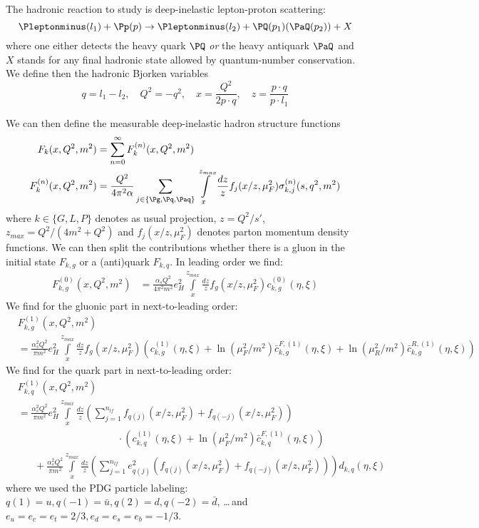The hadronic reaction to study is deep-inelastic lepton-proton scattering:
\begin{equation}
\Pleptonminus(l_1) + \Pp(p) \rightarrow \Pleptonminus(l_2) + \PQ(p_1)(\PaQ(p_2)) + X
\end{equation}
where one either detects the heavy quark $\PQ$ \textit{or} the heavy antiquark $\PaQ$ and $X$ stands for any final hadronic state allowed by quantum-number conservation. We define then the hadronic Bjorken variables
\begin{equation}
q=l_1-l_2, \quad Q^2=-q^2, \quad x=\frac{Q^2}{2p\cdot q}, \quad z = \frac{p\cdot q}{p\cdot l_1}
\end{equation}

We can then define the measurable deep-inelastic hadron structure functions
\begin{align}
F_k(x,Q^2,m^2) &= \sum_{n=0}^\infty F_{k}^{(n)}(x,Q^2,m^2)\\
F_{k}^{(n)}(x,Q^2,m^2) &= \frac{Q^2}{4\pi^2\alpha} \sum_{j\in\{\Pg,\Pq,\Paq\}}\int\limits_x^{z_{max}} \frac{dz}{z} f_j(x/z,\mu_F^2) \sigma^{(n)}_{k,j}(s,q^2,m^2)
\end{align}
where $k\in\{G,L,P\}$ denotes as usual projection, $z=Q^2/s'$, $z_{max} = Q^2/(4m^2+Q^2)$ and $f_j(x/z,\mu_F^2)$ denotes parton momentum density functions\cite{Martin:2009iq,PhysRevLett.113.012001}.
We can then split the contributions whether there is a gluon in the initial state $F_{k,g}$ or a (anti)quark $F_{k,q}$. In leading order we find:
\begin{align}
F_{k,g}^{(0)}(x,Q^2,m^2) &= \frac{\alpha_sQ^2}{4\pi^2m^2}e_H^2\int\limits_x^{z_{max}}\frac{dz}{z} f_g(x/z,\mu_F^2) c^{(0)}_{k,g}(\eta,\xi)
\end{align}
We find for the gluonic part in next-to-leading order:
\begin{align}
&F_{k,g}^{(1)}(x,Q^2,m^2) \nonumber\\
 &= \frac{\alpha_s^2Q^2}{\pi m^2}e_H^2\int\limits_x^{z_{max}}\frac{dz}{z} f_g(x/z,\mu_F^2) \left(c_{k,g}^{(1)}(\eta,\xi) + \ln(\mu_F^2/m^2)\bar c_{k,g}^{F,(1)}(\eta,\xi) + \ln(\mu_R^2/m^2)\bar c_{k,g}^{R,(1)}(\eta,\xi)\right)
\end{align}
We find for the quark part in next-to-leading order:
\begin{align}
&F_{k,q}^{(1)}(x,Q^2,m^2) \nonumber\\
 &= \frac{\alpha_s^2Q^2}{\pi m^2}e_H^2\int\limits_x^{z_{max}}\frac{dz}{z} \left(\sum_{j=1}^{n_{lf}}f_{q(j)}(x/z,\mu_F^2)+f_{q(-j)}(x/z,\mu_F^2)\right) \nonumber\\
 &\hspace{120pt} \cdot\left(c_{k,q}^{(1)}(\eta,\xi) + \ln(\mu_F^2/m^2)\bar c_{k,q}^{F,(1)}(\eta,\xi)\right) \nonumber\\
 &\hspace{20pt} + \frac{\alpha_s^2Q^2}{\pi m^2}\int\limits_x^{z_{max}}\frac{dz}{z} \left(\sum_{j=1}^{n_{lf}}e_{q(j)}^2\left(f_{q(j)}(x/z,\mu_F^2)+f_{q(-j)}(x/z,\mu_F^2)\right)\right) d_{k,q}(\eta,\xi)
\end{align}
where we used the PDG particle labeling\cite{Hagiwara:2002fs}: $q(1)=u,q(-1)=\bar u,q(2)=d,q(-2)=\bar d$, \ldots\,and $e_u = e_c = e_t = 2/3, e_d=e_s=e_b=-1/3$. 

